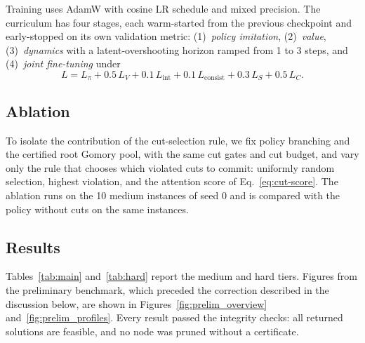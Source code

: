 \documentclass[11pt,a4paper]{article}
\begin{document}
Training uses AdamW with cosine LR schedule and mixed precision. The
curriculum has four stages, each warm-started from the previous checkpoint and
early-stopped on its own validation metric: (1)~\emph{policy imitation},
(2)~\emph{value}, (3)~\emph{dynamics} with a latent-overshooting horizon
ramped from 1 to 3 steps, and (4)~\emph{joint fine-tuning} under
\begin{equation}
  L = L_{\pi} + 0.5\,L_V + 0.1\,L_{\mathrm{int}} + 0.1\,L_{\mathrm{consist}}
      + 0.3\,L_S + 0.5\,L_C.
\end{equation}

\subsection{Ablation}

To isolate the contribution of the cut-selection rule, we fix policy branching and the certified root Gomory pool, with the same cut gates and cut budget, and vary only the rule that chooses which violated cuts to commit: uniformly random selection, highest violation, and the attention score of Eq.~\eqref{eq:cut-score}. The ablation runs on the 10 medium instances of seed 0 and is compared with the policy without cuts on the same instances.

\subsection{Results}
\label{sec:results}

Tables~\ref{tab:main} and~\ref{tab:hard} report the medium and hard tiers. Figures from the preliminary benchmark, which preceded the correction described in the discussion below, are shown in Figures~\ref{fig:prelim_overview} and~\ref{fig:prelim_profiles}. Every result passed the integrity checks: all returned solutions are feasible, and no node was pruned without a certificate.
\end{document}
